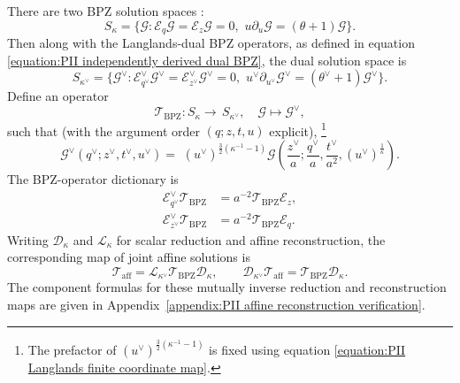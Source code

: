 \documentclass[a4paper,11pt]{article}
\numberwithin{equation}{section}
\begin{document}
There are two BPZ solution spaces : 
\begin{equation}
S_\kappa = \big\{\mathcal{G} : \mathcal{E}_q \mathcal{G} = \mathcal{E}_z \mathcal{G} = 0, \,\,u\partial_u \mathcal{G} = (\theta+1)\mathcal{G}\big\}.
\end{equation}
Then along with the Langlands-dual BPZ operators, as defined in equation \eqref{equation:PII independently derived dual BPZ}, the dual solution space is
\begin{equation}
S_{\kappa^\vee} = \{\mathcal{G}^\vee : \mathcal{E}^\vee_{q^\vee} \mathcal{G}^\vee = \mathcal{E}^\vee_{z^\vee} \mathcal{G}^\vee= 0, \,\,u^\vee\partial_{u^\vee}\mathcal{G}^\vee =(\theta^\vee+1)\mathcal{G}^\vee \}. 
\end{equation}
Define an operator 
\begin{equation}
\label{eq:intertwiner}
\mathcal{T}_{\mathrm{BPZ}} : S_\kappa \rightarrow \, S_{\kappa^\vee}, \quad 
\mathcal{G} \mapsto \mathcal{G}^\vee,
\end{equation}
such that (with the argument order $(q;z,t,u)$ explicit),  \footnote{The prefactor of $(u^\vee)^{\frac32(\kappa^{-1}-1)}$ is fixed using equation \eqref{equation:PII Langlands finite coordinate map}.}
\begin{equation}
	\label{equation:PII Langlands transformed block}    \mathcal{G}^\vee(q^{\vee};z^{\vee},t^{\vee},u^{\vee})
		=\,\, (u^{\vee})^{\frac{3}{2}(\kappa^{-1}-1)}
		\mathcal{G}\left(\frac{z^{\vee}}{a};
		\frac{q^{\vee}}{a},
		\frac{t^{\vee}}{a^{2}},
		(u^{\vee})^{\frac{1}{\kappa}}\right).
\end{equation}
The BPZ-operator dictionary is
\begin{equation}
	\label{equation:PII Langlands BPZ dictionary}
	\begin{aligned}
		\mathcal{E}_{q^{\vee}}^{\vee}\mathcal{T}_{\mathrm{BPZ}}
		&=a^{-2}\mathcal{T}_{\mathrm{BPZ}}\mathcal{E}_{z},\\
		\mathcal{E}_{z^{\vee}}^{\vee}\mathcal{T}_{\mathrm{BPZ}}
		&=a^{-2}\mathcal{T}_{\mathrm{BPZ}}\mathcal{E}_{q}.
	\end{aligned}
\end{equation}
Writing $\mathscr{D}_{\kappa}$ and $\mathscr{L}_{\kappa}$ for
scalar reduction and affine reconstruction, the corresponding map
of joint affine solutions is
\begin{equation}
	\label{equation:PII Langlands affine intertwiner}
	\mathcal{T}_{\mathrm{aff}}
	=\mathscr{L}_{\kappa^{\vee}}
	\mathcal{T}_{\mathrm{BPZ}}\mathscr{D}_{\kappa},
	\qquad
	\mathscr{D}_{\kappa^{\vee}}\mathcal{T}_{\mathrm{aff}}
	=\mathcal{T}_{\mathrm{BPZ}}\mathscr{D}_{\kappa}.
\end{equation}
The component formulas for these mutually inverse reduction and
reconstruction maps are given in
Appendix~\ref{appendix:PII affine reconstruction verification}.
\end{document}
